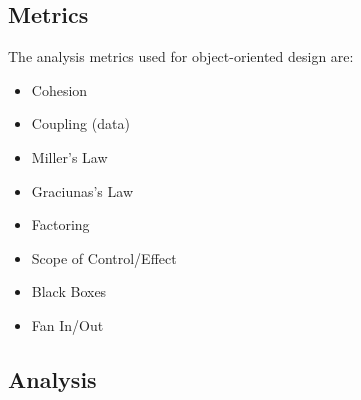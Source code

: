 \documentclass{article}
\begin{document}
	\subsection{Metrics}
		The analysis metrics used for object-oriented design are:
		\begin{itemize}
			\item Cohesion
			\item Coupling (data)
			\item Miller's Law
			\item Graciunas's Law
			\item Factoring
			\item Scope of Control/Effect
			\item Black Boxes
			\item Fan In/Out
		\end{itemize}
	\subsection{Analysis}
\end{document}

